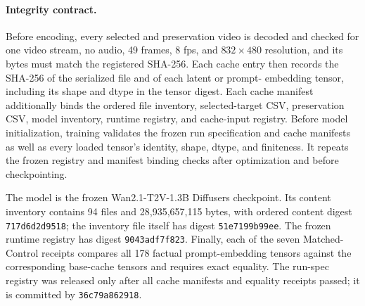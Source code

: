 \paragraph{Integrity contract.}
Before encoding, every selected and preservation video is decoded and checked
for one video stream, no audio, 49 frames, 8 fps, and \(832\times480\)
resolution, and its bytes must match the registered SHA-256.  Each cache entry
then records the SHA-256 of the serialized file and of each latent or prompt-
embedding tensor, including its shape and dtype in the tensor digest.  Each
cache manifest additionally binds the ordered file inventory, selected-target
CSV, preservation CSV, model inventory, runtime registry, and cache-input
registry. Before model initialization, training validates the frozen run
specification and cache manifests as well as every loaded tensor's identity,
shape, dtype, and finiteness. It repeats the frozen registry and manifest
binding checks after optimization and before checkpointing.

The model is the frozen Wan2.1-T2V-1.3B Diffusers checkpoint.  Its content
inventory contains 94 files and 28,935,657,115 bytes, with ordered content
digest
\texttt{717d6d2d9518};
the inventory file itself has digest
\texttt{51e7199b99ee}.
The frozen runtime registry has digest
\texttt{9043adf7f823}.
Finally, each of the seven Matched-Control receipts compares all 178 factual
prompt-embedding tensors against the corresponding base-cache tensors and
requires exact equality.  The run-spec registry was released only after all
cache manifests and equality receipts passed; it is committed by
\texttt{36c79a862918}.
